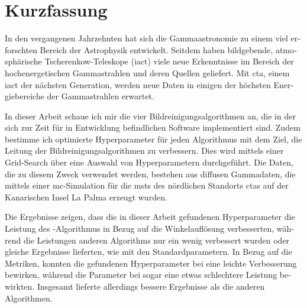 \section*{Kurzfassung}
\begin{otherlanguage}{ngerman}
In den vergangenen Jahrzehnten hat sich die Gammaastronomie zu einem viel erforschten Bereich der
Astrophysik entwickelt. Seitdem haben bildgebende, atmosphärische Tscherenkow-Teleskope (\gls{iact})
viele neue Erkenntnisse im Bereich der hochenergetischen Gammastrahlen und deren Quellen geliefert.
Mit \gls{cta}, einem \gls{iact} der nächsten Generation, werden neue Daten in einigen der höchsten
Energiebereiche der Gammastrahlen erwartet.

In dieser Arbeit schaue ich mir die vier Bildreinigungsalgorithmen an, die in der sich zur Zeit für \cta{}
in Entwicklung befindlichen Software \ctapipe{} implementiert sind. Zudem bestimme ich optimierte
Hyperparameter für jeden Algorithmus mit dem Ziel, die Leitung der Bildreinigungsalgorithmen zu verbessern.
Dies wird mittels einer Grid-Search über eine Auswahl von Hyperparametern durchgeführt. Die Daten, die zu diesem
Zweck verwendet werden, bestehen aus diffusen Gammadaten, die mittels einer \gls{mc}-Simulation für die
\glspl{mst} des nördlichen Standorts \gls{cta}s auf der Kanarischen Insel La Palma erzeugt wurden.

Die Ergebnisse zeigen, dass die in dieser Arbeit gefundenen Hyperparameter die Leistung des \tcc{}-Algorithmus
in Bezug auf die Winkelauflösung verbesserten, während die Leistungen anderen Algorithms nur ein wenig
verbessert wurden oder gleiche Ergebnisse lieferten, wie mit den Standardparametern.
In Bezug auf die Metriken, konnten die gefundenen Hyperparameter bei \tcc{} eine leichte Verbesserung
bewirken, während die Parameter bei \fact{} sogar eine etwas schlechtere Leistung bewirkten.
Insgesamt lieferte \fact{} allerdings bessere Ergebnisse als die anderen Algorithmen.
\end{otherlanguage}
\glsresetall
